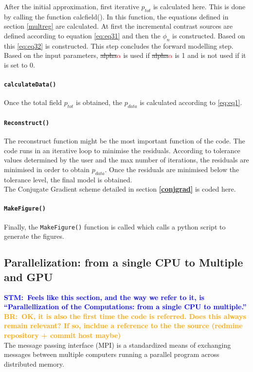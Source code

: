 \documentclass[10pt,a4paper]{article}
\newcommand{\commentstm}[1]{\textcolor{blue}{\textbf{STM:\ #1}}}
\newcommand{\newstm}[1]{\textcolor{red}{\textbf{#1}}}
\newcommand{\newstmtwo}[1]{\textcolor{orange}{\textbf{#1}}}
\newcommand{\oldstm}[1]{\sout{#1}}
\newcommand{\oldstmtwo}[1]{\xout{#1}}
\newcommand{\commentbr}[1]{\textcolor{orange}{\textbf{BR:\ #1}}}
\begin{document}
After the initial approximation, first iterative $p_{tot}$ is
calculated here. This is done by calling the function calcfield(). In
this function, the equations defined in section \oldstmtwo{2.5} \ref{multreg} are calculated.
At first the incremental contrast sources are defined according to
equation \ref{eq:eq31} and then the $\phi_n$ is constructed. Based on
this \ref{eq:eq32} is constructed. This step concludes the forward
modelling step.\\

Based on the input parameters, \oldstm{alpha}\newstm{$\alpha$} is used
if \oldstm{alpha}\newstm{$\alpha$} is 1 and is not used if it is set
to 0.

\paragraph{\texttt{calculateData()}}
Once the total field $p_{tot}$ is obtained, the $p_{data}$ is
calculated according to \ref{eq:eq1}.

\paragraph{\texttt{Reconstruct()}}
The reconstruct function might be the most important function of the
code. The code runs in an iterative loop to minimise the residuals.
According to tolerance values determined by the user and the max
number of iterations, the residuals are minimised in order to obtain
$p_{data}$. Once the residuals are minimised below the tolerance
level, the final model is obtained.\\

The Conjugate Gradient scheme detailed in section \oldstmtwo{2.4}\newstmtwo{\ref{conjgrad}} is coded here.

\paragraph{\texttt{MakeFigure()}}

Finally, the \texttt{MakeFigure()} function is called which calls a
python script to generate the figures.

\subsection{Parallelization: from a single CPU to Multiple and GPU}
\commentstm{Feels like this section, and the way we refer to it, is
``Parallellization of the Computations: from a single CPU to
multiple.''}
\commentbr{OK, it is also the first time the code is referred. Does
this always remain relevant? If so, incldue a reference to the the
source (redmine repository + commit host maybe)}\\
The message passing interface (MPI) is a standardized means of
exchanging messages between multiple computers running a parallel
program across distributed memory.
\end{document}
